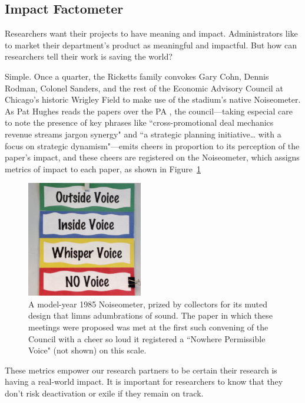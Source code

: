 \subsection{Impact Factometer}

Researchers want their projects to have meaning and impact. Administrators like to market their department's product as meaningful and impactful. But how can researchers tell their work is saving the world?

Simple. Once a quarter, the Ricketts family convokes Gary Cohn, Dennis Rodman,
Colonel Sanders, and the rest of the Economic Advisory Council at Chicago's
historic Wrigley Field to make use of the stadium's native Noiseometer. As Pat
Hughes reads the papers over the PA , the council---taking especial care to
note the presence of key phrases like ``cross-promotional deal mechanics
revenue streams jargon synergy" and ``a strategic planning initiative\ldots
with a focus on strategic dynamism"---emits cheers in proportion to its
perception of the paper's impact, and these cheers are registered on the
Noiseometer, which assigns metrics of impact to each paper, as shown in Figure~\ref{fig:noiseometer}


\begin{figure}
  \centering
  \includegraphics[width=0.45\textwidth]{figures/noiseometer.jpeg}
  \caption{A model-year 1985 Noiseometer, prized by collectors for its muted
  design that limns adumbrations of sound. The paper in which these meetings
were proposed was met at the first such convening of the Council with a cheer
so loud it registered a ``Nowhere Permissible Voice"  (not shown) on this scale.}
  \label{fig:noiseometer}
\end{figure}


These metrics empower our research partners to be certain their research is having a real-world impact.  It is important for researchers to know that they don't risk deactivation or exile if they remain on track.
